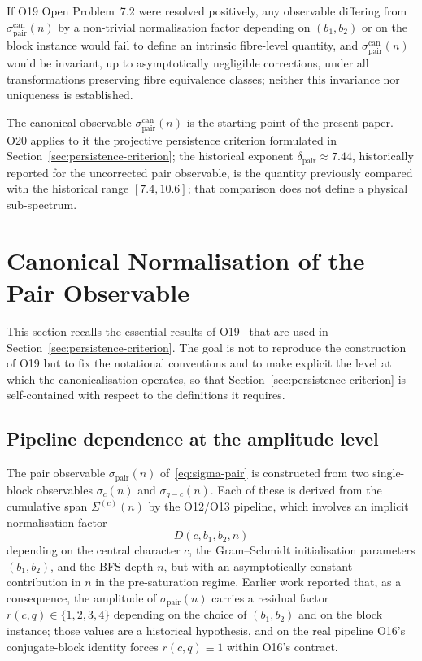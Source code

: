 \documentclass[11pt,a4paper]{article}
\theoremstyle{definition}
\theoremstyle{remark}
\begin{document}
      If O19 Open Problem~7.2 were resolved positively, any observable differing from
      $\sigma_{\mathrm{pair}}^{\mathrm{can}}(n)$ by a non-trivial
      normalisation factor depending on $(b_1,b_2)$ or on the block
      instance would fail to define an intrinsic fibre-level quantity, and
      $\sigma_{\mathrm{pair}}^{\mathrm{can}}(n)$ would be invariant, up to asymptotically
      negligible corrections, under all transformations preserving fibre equivalence classes;
      neither this invariance nor uniqueness is established.

      The canonical observable $\sigma_{\mathrm{pair}}^{\mathrm{can}}(n)$
      is the starting point of the present paper.
      O20 applies to it the projective persistence criterion formulated in
      Section~\ref{sec:persistence-criterion}; the historical exponent
      $\delta_{\mathrm{pair}} \approx 7.44$, historically reported for the uncorrected pair observable,
      is the quantity previously compared with the historical range
      $[7.4,10.6]$; that comparison does not define a physical sub-spectrum.


  \section{Canonical Normalisation of the Pair Observable}
    \label{sec:canonical-normalisation}

    This section recalls the essential results of
    O19~\cite{Beau2026a23} that are used in
    Section~\ref{sec:persistence-criterion}.
    The goal is not to reproduce the construction of O19 but to fix the
    notational conventions and to make explicit the level at which the
    canonicalisation operates, so that
    Section~\ref{sec:persistence-criterion} is self-contained with
    respect to the definitions it requires.

    \subsection{Pipeline dependence at the amplitude level}
      \label{sec:pipeline-dependence}

      The pair observable $\sigma_{\mathrm{pair}}(n)$
      of~\eqref{eq:sigma-pair} is constructed from two single-block
      observables $\sigma_c(n)$ and $\sigma_{q-c}(n)$.
      Each of these is derived from the cumulative span $\Sigma^{(c)}(n)$
      by the O12/O13 pipeline, which involves an implicit normalisation
      factor
      \[
        D(c, b_1, b_2, n)
      \]
      depending on the central character $c$, the Gram--Schmidt
      initialisation parameters $(b_1, b_2)$, and the BFS depth $n$,
      but with an asymptotically constant contribution in $n$ in the
      pre-saturation regime.
      Earlier work reported that, as a consequence, the amplitude of
      $\sigma_{\mathrm{pair}}(n)$ carries a residual factor $r(c,q) \in \{1,2,3,4\}$
      depending on the choice of $(b_1, b_2)$ and on the block instance; those values are
      a historical hypothesis, and on the real pipeline O16's conjugate-block identity
      forces $r(c,q) \equiv 1$ within O16's contract.
\end{document}
